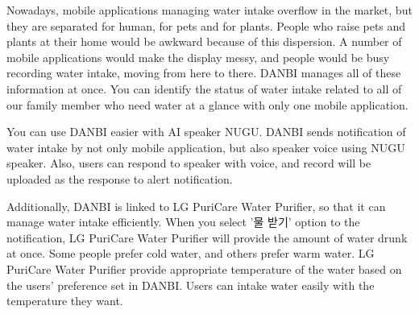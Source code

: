 \documentclass[conference]{IEEEtran}
\begin{document}
Nowadays, mobile applications managing water intake overflow in the market, but they are separated for human, for pets and for plants. People who raise pets and plants at their home would be awkward because of this dispersion. A number of mobile applications would make the display messy, and people would be busy recording water intake, moving from here to there. DANBI manages all of these information at once. You can identify the status of water intake related to all of our family member who need water at a glance with only one mobile application.

You can use DANBI easier with AI speaker NUGU. DANBI sends notification of water intake by not only mobile application, but also speaker voice using NUGU speaker. Also, users can respond to speaker with voice, and record will be uploaded as the response to alert notification.

Additionally, DANBI is linked to LG PuriCare Water Purifier, so that it can manage water intake efficiently. When you select '물 받기' option to the notification, LG PuriCare Water Purifier will provide the amount of water drunk at once. Some people prefer cold water, and others prefer warm water. LG PuriCare Water Purifier provide appropriate temperature of the water based on the users' preference set in DANBI. Users can intake water easily with the temperature they want.

\ 
\end{document}
